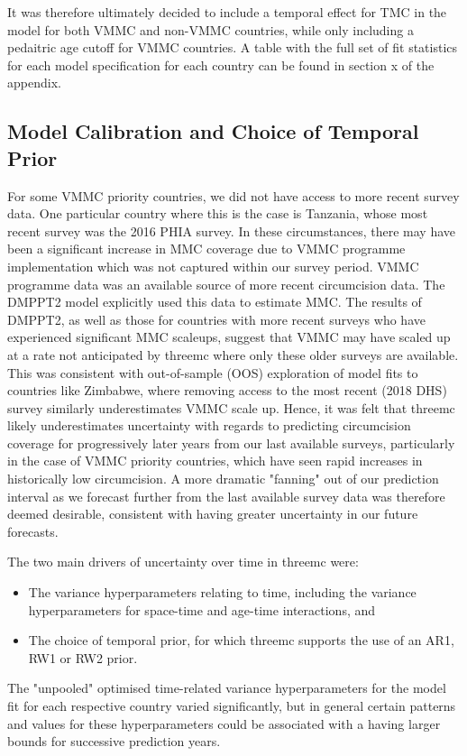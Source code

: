 \documentclass[a4paper, 12pt]{article}
\begin{document}
It was therefore ultimately decided to include a temporal effect for TMC in the model for both VMMC and non-VMMC countries, while only including a pedaitric age cutoff for VMMC countries.
A table with the full set of fit statistics for each model specification for each country can be found in section x of the appendix.

\subsection{Model Calibration and Choice of Temporal Prior}
\label{sec:orga44afa6}

For some VMMC priority countries, we did not have access to more recent survey data. 
One particular country where this is the case is Tanzania, whose most recent survey was the 2016 PHIA survey.
In these circumstances, there may have been a significant increase in MMC coverage due to VMMC programme implementation which was not captured within our survey period.
VMMC programme data was an available source of more recent circumcision data.
The DMPPT2 model explicitly used this data to estimate MMC. 
The results of DMPPT2, as well as those for countries with more recent surveys who have experienced significant MMC scaleups, suggest that VMMC may have scaled up at a rate not anticipated by threemc where only these older surveys are available.
This was consistent with out-of-sample (OOS) exploration of model fits to countries like Zimbabwe, where removing access to the most recent (2018 DHS) survey similarly underestimates VMMC scale up.
Hence, it was felt that threemc likely underestimates uncertainty with regards to predicting circumcision coverage for progressively later years from our last available surveys, particularly in the case of VMMC priority countries, which have seen rapid increases in historically low circumcision.
A more dramatic "fanning" out of our prediction interval as we forecast further from the last available survey data was therefore deemed desirable, consistent with having greater uncertainty in our future forecasts. 

The two main drivers of uncertainty over time in threemc were:
\begin{itemize}
\item The variance hyperparameters relating to time, including the variance hyperparameters for space-time and age-time interactions, and
\item The choice of temporal prior, for which threemc supports the use of an AR1, RW1 or RW2 prior.
\end{itemize}
The "unpooled" optimised time-related variance hyperparameters for the model fit for each respective country varied significantly, but in general certain patterns and values for these hyperparameters could be associated with a having larger bounds for successive prediction years.
\end{document}
